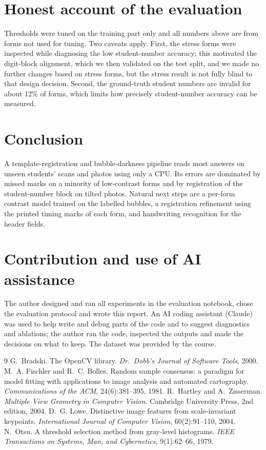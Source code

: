 \documentclass{article}
\begin{document}
\section{Honest account of the evaluation}\label{sec:honesty}
Thresholds were tuned on the training part only and all numbers above are from forms not used
for tuning. Two caveats apply. First, the stress forms were inspected while diagnosing the low
student-number accuracy; this motivated the digit-block alignment, which we then validated on the
test split, and we made no further changes based on stress forms, but the stress result is not
fully blind to that design decision. Second, the ground-truth student numbers are invalid for
about 12\% of forms, which limits how precisely student-number accuracy can be measured.

\section{Conclusion}
A template-registration and bubble-darkness pipeline reads most answers on unseen students'
scans and photos using only a CPU. Its errors are dominated by missed marks on a minority of
low-contrast forms and by registration of the student-number block on tilted photos. Natural next
steps are a per-form contrast model trained on the labelled bubbles, a registration refinement
using the printed timing marks of each form, and handwriting recognition for the header fields.

\section*{Contribution and use of AI assistance}
The author designed and ran all experiments in the evaluation notebook, chose the evaluation
protocol and wrote this report. An AI coding assistant (Claude) was used to help write and debug
parts of the code and to suggest diagnostics and ablations; the author ran the code, inspected the
outputs and made the decisions on what to keep. The dataset was provided by the course.

\small
\begin{thebibliography}{9}
 G.~Bradski. The OpenCV library. \emph{Dr.\ Dobb's Journal of Software Tools}, 2000.
 M.~A. Fischler and R.~C. Bolles. Random sample consensus: a paradigm for model fitting with applications to image analysis and automated cartography. \emph{Communications of the ACM}, 24(6):381--395, 1981.
 R.~Hartley and A.~Zisserman. \emph{Multiple View Geometry in Computer Vision}. Cambridge University Press, 2nd edition, 2004.
 D.~G. Lowe. Distinctive image features from scale-invariant keypoints. \emph{International Journal of Computer Vision}, 60(2):91--110, 2004.
 N.~Otsu. A threshold selection method from gray-level histograms. \emph{IEEE Transactions on Systems, Man, and Cybernetics}, 9(1):62--66, 1979.
\end{thebibliography}
\end{document}
